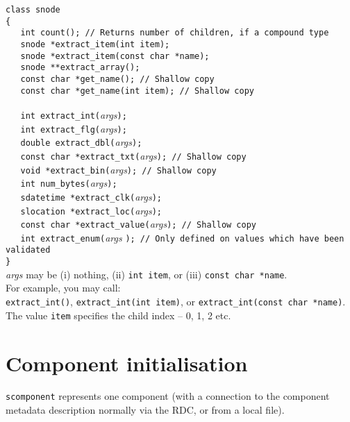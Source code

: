 \documentclass[12pt,a4paper,twoside]{article}
\renewcommand{\_}{\texttt{\symbol{95}}}
\begin{document}
\verb^class snode^\\
\verb^{^\\
\verb^   int count(); // Returns number of children, if a compound type^\\
\verb^   snode *extract_item(int item);^\\
\verb^   snode *extract_item(const char *name);^\\
\verb^   snode **extract_array();^\\
\verb^   const char *get_name(); // Shallow copy^\\
\verb^   const char *get_name(int item); // Shallow copy^\\
\verb^   ^\\
\verb^   int extract_int(^\textit{args}\verb^);^\\
\verb^   int extract_flg(^\textit{args}\verb^);^\\
\verb^   double extract_dbl(^\textit{args}\verb^);^\\
\verb^   const char *extract_txt(^\textit{args}\verb^); // Shallow copy^\\
\verb^   void *extract_bin(^\textit{args}\verb^); // Shallow copy^\\
\verb^   int num_bytes(^\textit{args}\verb^);^\\
\verb^   sdatetime *extract_clk(^\textit{args}\verb^);^\\
\verb^   slocation *extract_loc(^\textit{args}\verb^);^\\
\verb^   const char *extract_value(^\textit{args}\verb^); // Shallow copy^\\
\verb^   int extract_enum(^\textit{args}
	\verb^); // Only defined on values which have been validated^\\
\verb^}^\\

\textit{args} may be (i) nothing, (ii) \verb^int item^, or (iii)
\verb^const char *name^.\\
For example, you may call:\\
\verb^extract_int()^, \verb^extract_int(int item)^,
or \verb^extract_int(const char *name)^.\\
The value \verb^item^ specifies the child index -- 0, 1, 2 etc.

\section{Component initialisation}

\verb^scomponent^ represents one component (with a connection to the component
metadata description normally via the RDC, or from a local file).
\end{document}
